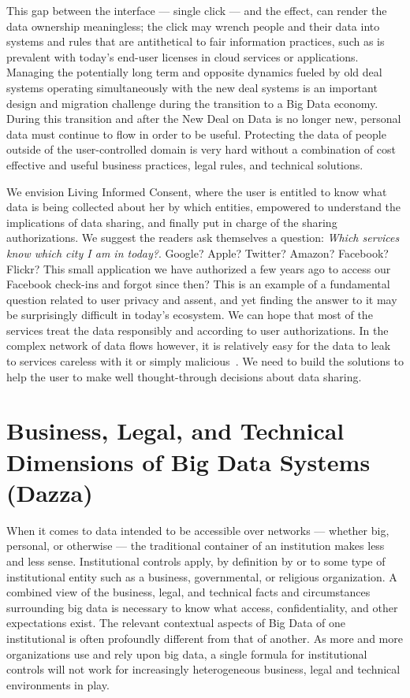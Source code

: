 This gap between the interface --- single click --- and the effect, can render the data ownership meaningless; the click may wrench people and their data into systems and rules that are antithetical to fair information practices, such as is prevalent with today's end-user licenses in cloud services or applications.
Managing the potentially long term and opposite dynamics fueled by old deal systems operating simultaneously with the new deal systems is an important design and migration challenge during the transition to a Big Data economy.
During this transition and after the New Deal on Data is no longer new, personal data must continue to flow in order to be useful.
Protecting the data of people outside of the user-controlled domain is very hard without a combination of cost effective and useful business practices, legal rules, and technical solutions.

We envision Living Informed Consent, where the user is entitled to know what data is being collected about her by which entities, empowered to understand the implications of data sharing, and finally put in charge of the sharing authorizations.
We suggest the readers ask themselves a question: \emph{Which services know which city I am in today?}.
Google? Apple? Twitter? Amazon? Facebook? Flickr?
This small application we have authorized a few years ago to access our Facebook check-ins and forgot since then? 
This is an example of a fundamental question related to user privacy and assent, and yet finding the answer to it may be surprisingly difficult in today's ecosystem.
We can hope that most of the services treat the data responsibly and according to user authorizations.
In the complex network of data flows however, it is relatively easy for the data to leak to services careless with it or simply malicious~\cite{biltongirls}.
We need to build the solutions to help the user to make well thought-through decisions about data sharing.



\section{Business, Legal, and Technical Dimensions of Big Data Systems (Dazza)}

When it comes to data intended to be accessible over networks --- whether big, personal, or otherwise --- the traditional container of an institution makes less and less sense.
Institutional controls apply, by definition by or to some type of institutional entity such as a business, governmental, or religious organization.
A combined view of the business, legal, and technical facts and circumstances surrounding big data is necessary to know what access, confidentiality, and other expectations exist.
The relevant contextual aspects of Big Data of one institutional is often profoundly different from that of another.
As more and more organizations use and rely upon big data, a single formula for institutional controls will not work for increasingly heterogeneous business, legal and technical environments in play.

